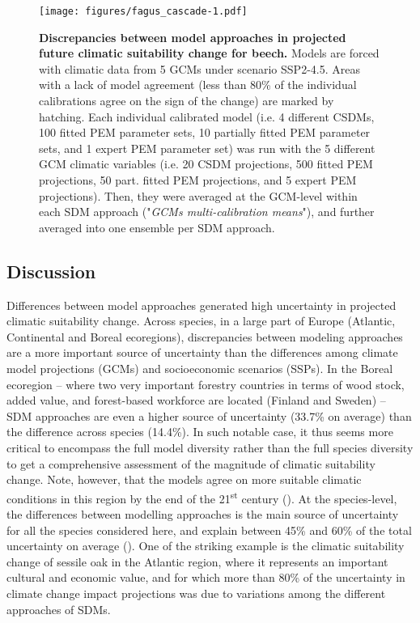 \documentclass[letterpaper,8pt]{article}  %
\begin{document}
\begin{doublespacing}
\begin{linenumbers}
\begin{figure}
\centering
\hspace*{-2cm}
\texttt{[image: figures/fagus\_cascade-1.pdf]}
\caption{\textbf{Discrepancies between model approaches in projected future climatic suitability change for beech.} Models are forced with climatic data from 5 GCMs under scenario SSP2-4.5. Areas with a lack of model agreement (less than 80\% of the individual calibrations agree on the sign of the change) are marked by hatching. Each individual calibrated model (i.e. 4 different CSDMs, 100 fitted PEM parameter sets, 10 partially fitted PEM parameter sets, and 1 expert PEM parameter set) was run with the 5 different GCM climatic variables (i.e. 20 CSDM projections, 500 fitted PEM projections, 50 part. fitted PEM projections, and 5 expert PEM projections). Then, they were averaged at the GCM-level within each SDM approach ("\emph{GCMs multi-calibration means}"), and further averaged into one ensemble per SDM approach.}
\label{fig:cascade}
\end{figure}

\subsection{Discussion}

Differences between model approaches generated high uncertainty in projected climatic suitability change. 
Across species, in a large part of Europe (Atlantic, Continental and Boreal ecoregions), discrepancies between modeling approaches are a more important source of uncertainty than the differences among climate model projections (GCMs) and socioeconomic scenarios (SSPs). In the Boreal ecoregion -- where two very important forestry countries in terms of wood stock, added value, and forest-based workforce are located (Finland and Sweden) -- SDM approaches are even a higher source of uncertainty (33.7\% on average) than the difference across species (14.4\%). In such notable case, it thus seems more critical to encompass the full model diversity rather than the full species diversity to get a comprehensive assessment of the magnitude of climatic suitability change. Note, however, that the models agree on more suitable climatic conditions in this region by the end of the 21\textsuperscript{st} century (). At the species-level, the differences between modelling approaches is the main source of uncertainty for all the species considered here, and explain between 45\% and 60\% of the total uncertainty on average (). 
One of the striking example is the climatic suitability change of sessile oak in the Atlantic region, where it represents an important cultural and economic value, and for which more than 80\% of the uncertainty in climate change impact projections was due to variations among the different approaches of SDMs.


\end{linenumbers}
\end{doublespacing}
\end{document}
